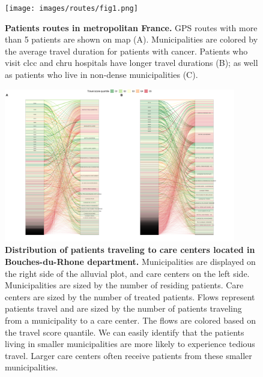 \begin{figure}[H]
    \texttt{[image: images/routes/fig1.png]}
    \centering
    \caption{
        \textbf{Patients routes in metropolitan France.} GPS routes with more than 5 patients are shown on map (A). Municipalities are colored by the average travel duration for patients with cancer. Patients who visit \ac{clcc} and \ac{chru} hospitals have longer travel durations (B); as well as patients who live in non-dense municipalities (C).
    }
    \label{fig:routes-duration-france}
\end{figure}

\begin{figure}[H]
    \includegraphics[width=0.9\textwidth]{images/routes/fig6.png}
    \centering
    \caption{
        \textbf{Distribution of patients traveling to care centers located in Bouches-du-Rhone department.} Municipalities are displayed on the right side of the alluvial plot, and care centers on the left side. Municipalities are sized by the number of residing patients. Care centers are sized by the number of treated patients. Flows represent patients travel and are sized by the number of patients traveling from a municipality to a care center. The flows are colored based on the travel score quantile. We can easily identify that the patients living in smaller municipalities are more likely to experience tedious travel. Larger care centers often receive patients from these smaller municipalities.
    }
    \label{fig:routes-alluvial-13}
\end{figure}

